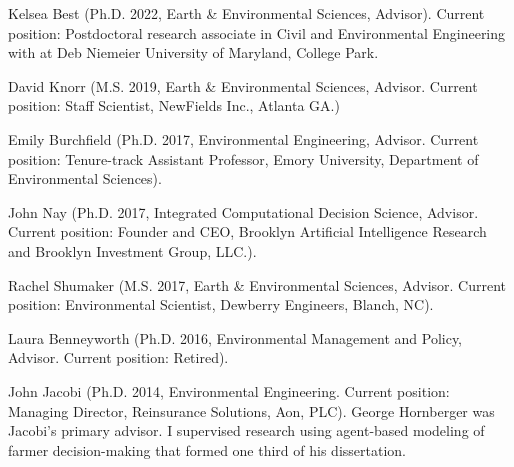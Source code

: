 \item Kelsea Best (Ph.D. 2022, Earth \& Environmental Sciences, Advisor).
  Current position: Postdoctoral research associate
  in Civil and Environmental Engineering
  with at Deb Niemeier University of Maryland, College Park.
\item David Knorr (M.S. 2019, Earth \& Environmental Sciences, Advisor. Current position: Staff Scientist, NewFields Inc., Atlanta GA.)
\item Emily Burchfield (Ph.D. 2017, Environmental Engineering, Advisor. Current position: Tenure-track Assistant Professor, Emory University, Department of Environmental Sciences).
\item John Nay (Ph.D. 2017, Integrated Computational Decision Science, Advisor. Current position: Founder and CEO, Brooklyn Artificial Intelligence Research and Brooklyn Investment Group, LLC.).
\item Rachel Shumaker (M.S. 2017, Earth \& Environmental Sciences, Advisor. Current position: Environmental Scientist, Dewberry Engineers, Blanch, NC).
\item Laura Benneyworth (Ph.D. 2016, Environmental Management and Policy, Advisor. Current position: Retired).
\item John Jacobi (Ph.D. 2014, Environmental Engineering. Current position: Managing Director, Reinsurance Solutions, Aon, PLC). George Hornberger was Jacobi's primary advisor. I supervised research using agent-based modeling of farmer decision-making that formed one third of his dissertation.
